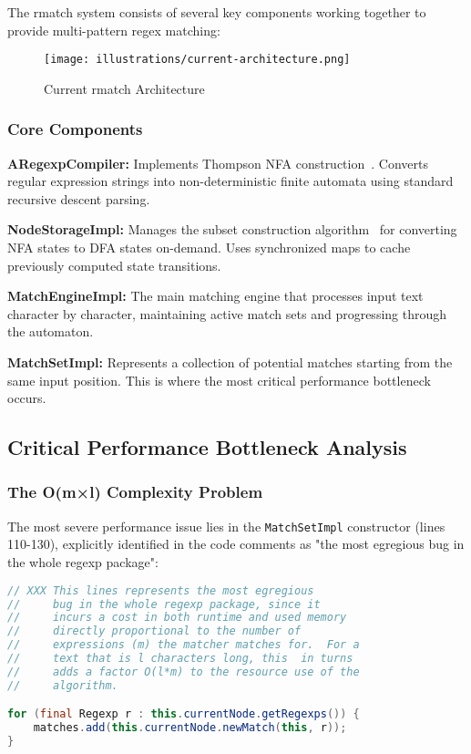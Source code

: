\documentclass[11pt,a4paper]{article}
\begin{document}
The rmatch system consists of several key components working together to provide multi-pattern regex matching:

\begin{figure}[htbp]
\centering
\texttt{[image: illustrations/current-architecture.png]}
\caption{Current rmatch Architecture}
\label{fig:current-arch}
\end{figure}

\subsubsection{Core Components}

\textbf{ARegexpCompiler:} Implements Thompson NFA construction~\cite{thompson1968programming}. Converts regular expression strings into non-deterministic finite automata using standard recursive descent parsing.

\textbf{NodeStorageImpl:} Manages the subset construction algorithm~\cite{hopcroft2001introduction} for converting NFA states to DFA states on-demand. Uses synchronized maps to cache previously computed state transitions.

\textbf{MatchEngineImpl:} The main matching engine that processes input text character by character, maintaining active match sets and progressing through the automaton.

\textbf{MatchSetImpl:} Represents a collection of potential matches starting from the same input position. This is where the most critical performance bottleneck occurs.

\subsection{Critical Performance Bottleneck Analysis}

\subsubsection{The O(m×l) Complexity Problem}

The most severe performance issue lies in the \texttt{MatchSetImpl} constructor (lines 110-130), explicitly identified in the code comments as "the most egregious bug in the whole regexp package":

\begin{lstlisting}[language=Java,caption=Critical bottleneck in MatchSetImpl]
// XXX This lines represents the most egregious
//     bug in the whole regexp package, since it
//     incurs a cost in both runtime and used memory
//     directly proportional to the number of
//     expressions (m) the matcher matches for.  For a
//     text that is l characters long, this  in turns
//     adds a factor O(l*m) to the resource use of the
//     algorithm.

for (final Regexp r : this.currentNode.getRegexps()) {
    matches.add(this.currentNode.newMatch(this, r));
}
\end{lstlisting}
\end{document}
